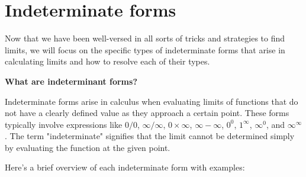 \section{Indeterminate forms}

Now that we have been well-versed in all sorts of tricks and strategies to find limits, we will focus on the specific types of indeterminate forms that arise in calculating limits and how to resolve each of their types. 


\textbf{What are indeterminant forms?}

Indeterminate forms arise in calculus when evaluating limits of functions that do not have a clearly defined value as they approach a certain point. These forms typically involve expressions like $0/0$, $\infty/\infty$, $0 \times \infty$, $\infty - \infty$, $0^0$, $1^\infty$, $\infty^0$, and $\infty^\infty$. The term "indeterminate" signifies that the limit cannot be determined simply by evaluating the function at the given point.

Here's a brief overview of each indeterminate form with examples:

